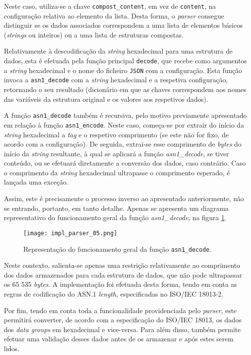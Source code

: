 \vspace{0.5cm}

Neste caso, utiliza-se a chave \texttt{compost\_content}, em vez de \texttt{content}, na configuração relativa ao elemento da lista. Desta forma, o \textit{parser} consegue distinguir se os dados associados correspondem a uma lista de elementos básicos (\textit{strings} ou inteiros) ou a uma lista de estruturas compostas.

Relativamente à descodificação da \textit{string} hexadecimal para uma estrutura de dados, esta é efetuada pela função principal \texttt{decode}, que recebe como argumentos a \textit{string} hexadecimal e o nome do ficheiro \texttt{JSON} com a configuração. Esta função invoca a \texttt{asn1\_decode} com a \textit{string} hexadecimal e a respetiva configuração, retornando o seu resultado (dicionário em que as chaves correspondem aos nomes das variáveis da estrutura original e os valores aos respetivos dados).

A função \texttt{asn1\_decode} também é recursiva, pelo motivo previamente apresentado em relação à função \texttt{asn1\_encode}. Neste caso, começa-se por extrair do início da \textit{string} hexadecimal a \textit{tag} e o respetivo comprimento (se este não for fixo, de acordo com a configuração). De seguida, extrai-se esse comprimento de \textit{bytes} do início da \textit{string} resultante, à qual se aplicará a função \textit{asn1\_decode}, se tiver conteúdo, ou se efetuará diretamente a conversão dos dados, caso contrário. Caso o comprimento da \textit{string} hexadecimal ultrapasse o comprimento esperado, é lançada uma exceção.

Assim, este é precisamente o processo inverso ao apresentado anteriormente, não se entrando, portanto, em tanto detalhe. Apenas se apresenta um diagrama representativo do funcionamento geral da função \textit{asn1\_decode}, na figura \ref{fig:impl_parser_05}.


\begin{figure}[H]
    \centering
    \texttt{[image: impl\_parser\_05.png]}
    \caption{Representação do funcionamento geral da função \texttt{asn1\_decode}.}
    \label{fig:impl_parser_05}
\end{figure}

Neste contexto, salienta-se apenas uma restrição relativamente ao comprimento dos dados armazenados para cada estrutura de dados, que não pode ultrapassar os 65 535 \textit{bytes}. A implementação foi efetuada desta forma, tendo em conta as regras de codificação do ASN.1 \textit{length}, especificadas no ISO/IEC 18013-2.

Por fim, tendo em conta toda a funcionalidade providenciada pelo \textit{parser}, este permitirá converter, de acordo com a especificação do ISO/IEC 18013, os dados dos \textit{data groups} em hexadecimal e vice-versa. Para além disso, também permite efetuar uma validação desses dados antes de os armazenar e após estes serem lidos.
